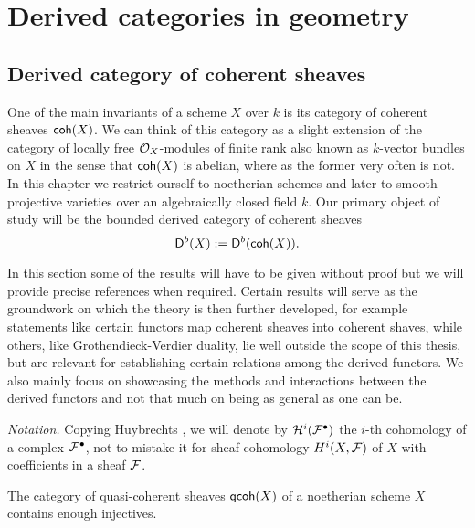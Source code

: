 \section{Derived categories in geometry}
\label{Derived categories in geometry}

\subsection{Derived category of coherent sheaves}
\label{Subsection: Derived category of coherent sheaves}

One of the main invariants of a scheme $X$ over $k$ is its category of coherent sheaves $\mathsf{coh}(X)$. We can think of this category as a slight extension of the category of locally free $\mathcal O_X$-modules of finite rank also known as $k$-vector bundles on $X$ in the sense that $\mathsf{coh}(X)$ is abelian, where as the former very often is not. In this chapter we restrict ourself to noetherian schemes and later to smooth projective varieties over an algebraically closed field $k$. Our primary object of study will be the bounded derived category of coherent sheaves
\[
    \mathsf{D}^b(X) := \mathsf{D}^b(\mathsf{coh}(X)).
\]

In this section some of the results will have to be given without proof
but we will provide precise references when required. Certain results will serve as the groundwork on which the theory is then further developed, for example statements like certain functors map coherent sheaves into coherent shaves, while others, like Grothendieck-Verdier duality, lie well outside the scope of this thesis, but are relevant for establishing certain relations among the derived functors. We also mainly focus on showcasing the methods and interactions between the derived functors and not that much on being as general as one can be. 

\vspace{0.3cm}
\noindent
\textsl{Notation.}
Copying Huybrechts \cite{huybrechts2006fouriermukai}, we will denote by $\mathcal H^i(\mathcal F^\bullet)$ the $i$-th cohomology of a complex $\mathcal F^\bullet$, not to mistake it for sheaf cohomology $H^{i}(X, \mathcal F)$ of $X$ with coefficients in a sheaf $\mathcal F$.

\begin{proposition}
    \label{qcoh of noetherian scheme contains enough injectives}
    The category of quasi-coherent sheaves $\mathsf{qcoh}(X)$ of a noetherian scheme $X$ contains enough injectives.
\end{proposition}

